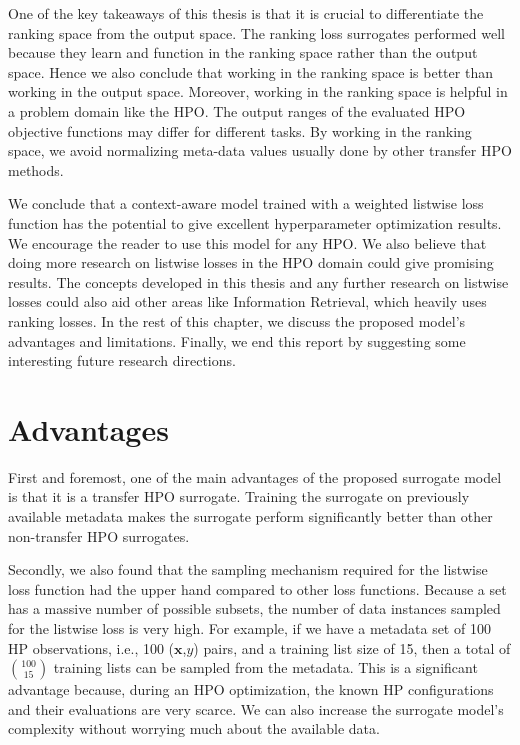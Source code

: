 \documentclass[12pt, twoside, ngerman]{report}
\begin{document}
One of the key takeaways of this thesis is that it is crucial to differentiate the ranking space from the output space. The ranking loss surrogates performed well because they learn and function in the ranking space rather than the output space. Hence we also conclude that working in the ranking space is better than working in the output space. Moreover, working in the ranking space is helpful in a problem domain like the HPO. The output ranges of the evaluated HPO objective functions may differ for different tasks. By working in the ranking space, we avoid normalizing meta-data values usually done by other transfer HPO methods.

We conclude that a context-aware model trained with a weighted listwise loss function has the potential to give excellent hyperparameter optimization results. We encourage the reader to use this model for any HPO. We also believe that doing more research on listwise losses in the HPO domain could give promising results. The concepts developed in this thesis and any further research on listwise losses could also aid other areas like Information Retrieval, which heavily uses ranking losses. In the rest of this chapter, we discuss the proposed model's advantages and limitations. Finally, we end this report by suggesting some interesting future research directions.

\section{Advantages}
\label{sec:advantages}

First and foremost, one of the main advantages of the proposed surrogate model is that it is a transfer HPO surrogate. Training the surrogate on previously available metadata makes the surrogate perform significantly better than other non-transfer HPO surrogates.

Secondly, we also found that the sampling mechanism required for the listwise loss function had the upper hand compared to other loss functions. Because a set has a massive number of possible subsets, the number of data instances sampled for the listwise loss is very high. 
For example, if we have a metadata set of 100 HP observations, i.e., 100 ($\textbf{x}$,$y$) pairs, and a training list size of 15, then a total of ${100 \choose 15}$ training lists can be sampled from the metadata.
This is a significant advantage because, during an HPO optimization, the known HP configurations and their evaluations are very scarce.
We can also increase the surrogate model's complexity without worrying much about the available data.
\end{document}
